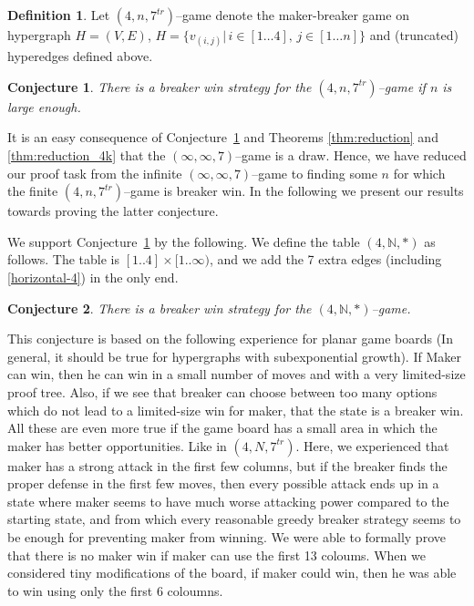 \documentclass[conference]{IEEEtran}
\newtheorem{conjecture}{Conjecture}[section]
\theoremstyle{definition}
\newtheorem{definition}{Definition}[section]
\begin{document}
\begin{definition}
Let $(4,n,7^{tr})$--game denote the maker-breaker game on hypergraph $H=(V,E)$, $H=\{ v_{(i,j)} | \, i\in [1 \dots 4],\, j \in [1 \dots n] \}$ and (truncated) hyperedges defined above.
\end{definition}


\begin{conjecture}
\label{thm:csoka}
There is a breaker win strategy for the $(4,n,7^{tr})$--game if $n$ is large enough. 
\end{conjecture}

It is an easy consequence of Conjecture~\ref{thm:csoka} and Theorems \ref{thm:reduction} and \ref{thm:reduction_4k} that the $(\infty,\infty,7)$--game is a draw. Hence, we have reduced our proof task from the infinite $(\infty,\infty,7)$--game to finding some $n$ for which the finite $(4,n,7^{tr})$--game is breaker win. In the following we present our results towards proving the latter conjecture.

We support Conjecture~\ref{thm:csoka} by the following. We define the table $(4, \mathbb{N}, *)$ as follows. The table is $[1..4] \times [1..\infty)$, and we add the 7 extra edges (including \eqref{horizontal-4}) in the only end.

\begin{conjecture}
\label{thm:csoka2}
There is a breaker win strategy for the $(4, \mathbb{N}, *)$--game. 
\end{conjecture}

This conjecture is based on the following experience for planar game boards (In general, it should be true for hypergraphs with subexponential growth).
If Maker can win, then he can win in a small number of moves and with a very limited-size proof tree.
Also, if we see that breaker can choose between too many options which do not lead to a limited-size win for maker, that the state is a breaker win. 
All these are even more true if the game board has a small area in which the maker has better opportunities. Like in $(4, N, 7^{tr})$.
Here, we experienced that maker has a strong attack in the first few columns, but if the breaker finds the proper defense in the first few moves, then every possible attack ends up in a state where maker seems to have much worse attacking power compared to the starting state, and from which every reasonable greedy breaker strategy seems to be enough for preventing maker from winning.
We were able to formally prove that there is no maker win if maker can use the first 13 coloums.
When we considered tiny modifications of the board, if maker could win, then he was able to win using only the first 6 coloumns.
\end{document}

